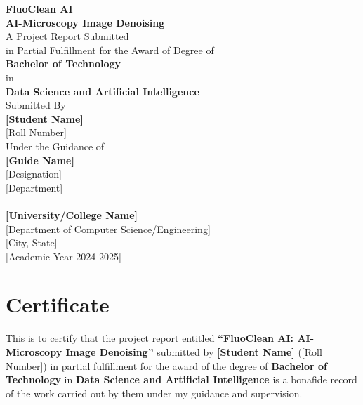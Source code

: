 \documentclass[12pt,a4paper]{report}
\begin{document}
\begin{titlepage}
\centering
\vspace*{2cm}
{\Huge \textbf{FluoClean AI}}\\[0.5cm]
{\Large \textbf{AI-Microscopy Image Denoising}}\\[2cm]

{\large A Project Report Submitted}\\[0.3cm]
{\large in Partial Fulfillment for the Award of Degree of}\\[0.3cm]
{\large \textbf{Bachelor of Technology}}\\[0.3cm]
{\large in}\\[0.3cm]
{\large \textbf{Data Science and Artificial Intelligence}}\\[2cm]

{\large Submitted By}\\[0.3cm]
{\large \textbf{[Student Name]}}\\[0.2cm]
{\large [Roll Number]}\\[2cm]

{\large Under the Guidance of}\\[0.3cm]
{\large \textbf{[Guide Name]}}\\[0.2cm]
{\large [Designation]}\\[0.2cm]
{\large [Department]}\\[2cm]

{}\\[1cm]

{\large \textbf{[University/College Name]}}\\[0.2cm]
{\large [Department of Computer Science/Engineering]}\\[0.2cm]
{\large [City, State]}\\[0.5cm]

{\large [Academic Year 2024-2025]}\\[1cm]

\vspace*{1cm}
\end{titlepage}

\chapter*{Certificate}
\thispagestyle{plain}

\noindent This is to certify that the project report entitled \textbf{``FluoClean AI: AI-Microscopy Image Denoising''} submitted by \textbf{[Student Name]} ([Roll Number]) in partial fulfillment for the award of the degree of \textbf{Bachelor of Technology} in \textbf{Data Science and Artificial Intelligence} is a bonafide record of the work carried out by them under my guidance and supervision.
\end{document}
